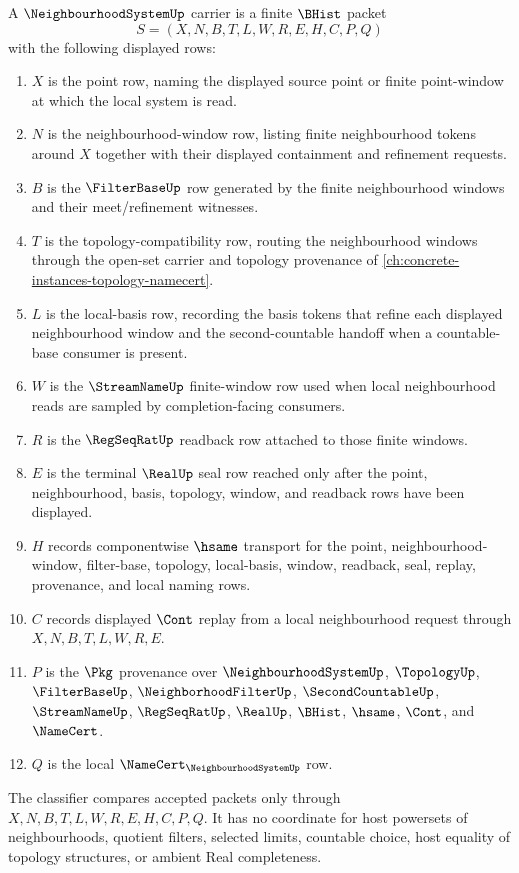 \begin{definition}
\label{def:neighbourhood-system-carrier}
A $\NeighbourhoodSystemUp$ carrier is a finite $\BHist$ packet
$$
S=(X,N,B,T,L,W,R,E,H,C,P,Q)
$$
with the following displayed rows:
\begin{enumerate}
\item $X$ is the point row, naming the displayed source point or finite point-window at which the local system is read.
\item $N$ is the neighbourhood-window row, listing finite neighbourhood tokens around $X$ together with their displayed containment and refinement requests.
\item $B$ is the $\FilterBaseUp$ row generated by the finite neighbourhood windows and their meet/refinement witnesses.
\item $T$ is the topology-compatibility row, routing the neighbourhood windows through the open-set carrier and topology provenance of \autoref{ch:concrete-instances-topology-namecert}.
\item $L$ is the local-basis row, recording the basis tokens that refine each displayed neighbourhood window and the second-countable handoff when a countable-base consumer is present.
\item $W$ is the $\StreamNameUp$ finite-window row used when local neighbourhood reads are sampled by completion-facing consumers.
\item $R$ is the $\RegSeqRatUp$ readback row attached to those finite windows.
\item $E$ is the terminal $\RealUp$ seal row reached only after the point, neighbourhood, basis, topology, window, and readback rows have been displayed.
\item $H$ records componentwise $\hsame$ transport for the point, neighbourhood-window, filter-base, topology, local-basis, window, readback, seal, replay, provenance, and local naming rows.
\item $C$ records displayed $\Cont$ replay from a local neighbourhood request through $X,N,B,T,L,W,R,E$.
\item $P$ is the $\Pkg$ provenance over $\NeighbourhoodSystemUp$, $\TopologyUp$, $\FilterBaseUp$, $\NeighborhoodFilterUp$, $\SecondCountableUp$, $\StreamNameUp$, $\RegSeqRatUp$, $\RealUp$, $\BHist$, $\hsame$, $\Cont$, and $\NameCert$.
\item $Q$ is the local $\NameCert_{\NeighbourhoodSystemUp}$ row.
\end{enumerate}
The classifier compares accepted packets only through $X,N,B,T,L,W,R,E,H,C,P,Q$. It has no coordinate for host powersets of neighbourhoods, quotient filters, selected limits, countable choice, host equality of topology structures, or ambient Real completeness.
\end{definition}

